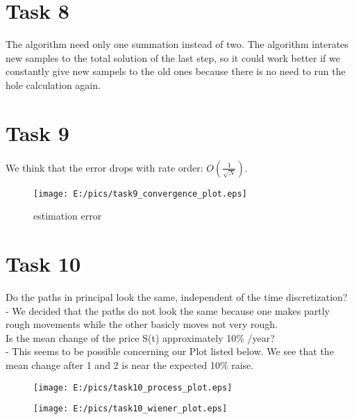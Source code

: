 \documentclass{article}
\begin{document}
\section*{Task 8}
The algorithm need only one summation instead of two. The algorithm interates new samples to the total solution of the last step, so it could work better if we constantly give new sampels to the old ones because there is no need to run the hole calculation again. 

\newpage
\section*{Task 9}
We think that the error drops with rate order: $O\left(\frac{1}{\sqrt{N}}\right)$.
\begin{figure}[htbp]
	\centering
		\texttt{[image: E:/pics/task9\_convergence\_plot.eps]}
	\caption{estimation error}
	\label{fig:task9_convergence_plot}
\end{figure}

\section*{Task 10}
Do the paths in principal look the same, independent of the time discretization?\\
- We decided that the paths do not look the same because one makes partly rough movements while the other basicly moves not very rough.\\
Is the mean change of the price S(t) approximately 10\% /year?\\
- This seems to be possible concerning our Plot listed below. We see that the mean change after 1 and 2 is near the expected 10\% raise.


\begin{figure}[htbp]
	\centering
		\texttt{[image: E:/pics/task10\_process\_plot.eps]}
	\label{fig:task10_process_plot}
\end{figure}
\begin{figure}[htbp]
	\centering
		\texttt{[image: E:/pics/task10\_wiener\_plot.eps]}
	\label{fig:task10_wiener_plot}
\end{figure}
\end{document}
